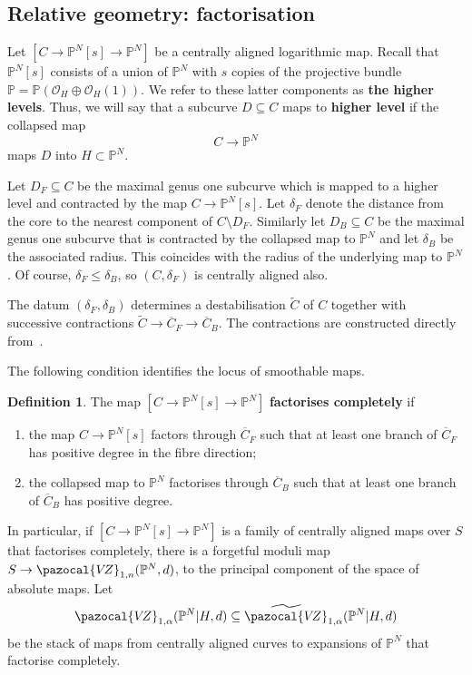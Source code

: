\documentclass[11pt]{amsart}
\newcommand{\PP}{\mathbb P}
\newcommand{\VZ}{\pazocal{V\!Z}}
\renewcommand{\to}{\rightarrow}
\theoremstyle{definition}
\theoremstyle{definition}
\newtheorem{definition}[thm]{Definition}
\begin{document}
\subsection{Relative geometry: factorisation}\label{subsection factorisation} Let $[C\to \mathbb P^N[s]\to \mathbb P^N]$ be a centrally aligned logarithmic map. Recall that $\mathbb P^N[s]$ consists of a union of $\mathbb P^N$ with $s$ copies of the projective bundle $\mathbb{P} = \mathbb P(\mathcal O_H\oplus \mathcal O_H(1))$. We refer to these latter components as \textbf{the higher levels}. Thus, we will say that a subcurve $D\subseteq C$ maps to \textbf{higher level} if the collapsed map
\[
C\to \mathbb P^N
\]
maps $D$ into $H\subset \mathbb P^N$. 

Let $D_F\subseteq C$ be the maximal genus one subcurve which is mapped to a higher level and contracted by the map $C\to \mathbb P^N[s]$. Let $\delta_F$ denote the distance from the core to the nearest component of $C \setminus D_F$. Similarly let $D_B\subseteq C$ be the maximal genus one subcurve that is contracted by the collapsed map to $\mathbb P^N$ and let $\delta_B$ be the associated radius. This coincides with the radius of the underlying map to $\mathbb P^N$. Of course, $\delta_F\leq \delta_B$, so $(C,\delta_F)$ is centrally aligned also.

The datum $(\delta_F,\delta_B)$ determines a destabilisation $\widetilde C$ of $C$ together with successive contractions $\widetilde C\to \overline C_F\to\overline C_B$. The contractions are constructed directly from~\cite[Section~3]{RSPW}.

The following condition identifies the locus of smoothable maps. 

\begin{definition}
The map $[C\to \mathbb P^N[s]\to \mathbb P^N]$ \textbf{factorises completely} if
\begin{enumerate}
\item the map $C\to \mathbb P^N[s]$ factors through $\overline C_F$ such that at least one branch of $\overline C_F$ has positive degree in the fibre direction; 
\item the collapsed map to $\mathbb P^N$ factorises through $\overline C_B$ such that at least one branch of $\overline C_B$ has positive degree.
\end{enumerate}
\end{definition}

In particular, if $[C\to \mathbb P^N[s]\to \mathbb P^N]$ is a family of centrally aligned maps over $S$ that factorises completely, there is a forgetful moduli map $S\to \VZ_{1,n}(\mathbb P^N,d)$, to the principal component of the space of absolute maps. Let
\begin{equation*} \VZ_{1,\alpha}(\mathbb P^N|H,d) \subseteq \widetilde\VZ_{1,\alpha}(\PP^N|H,d) \end{equation*}
be the stack of maps from centrally aligned curves to expansions of $\mathbb P^N$ that factorise completely.
\end{document}
